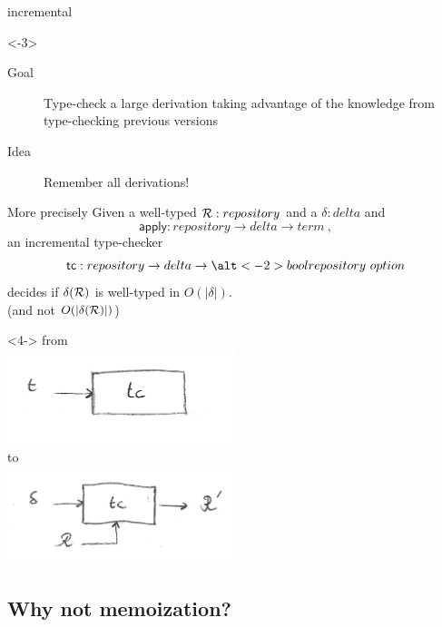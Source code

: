 \documentclass[ignorenonframetext,red]{beamer}
\begin{document}
\begin{frame}{ incremental
    }
  \begin{onlyenv}<-3>
    \begin{description}
    \item[Goal] Type-check a large derivation taking advantage of the
      knowledge from type-checking previous versions
    \item[Idea] Remember all derivations!
    \end{description}
    \pause \inXLF
    \begin{block}{More precisely}
      Given a well-typed $\mathcal{R} : repository$ and a $\delta : delta$
      and $$\mathsf{apply} : repository \to delta \to term\ ,$$an
      incremental type-checker $$\mathsf{tc} : repository \to delta
      \to \alt<-2>{bool}{repository\ option} $$ decides if
      $\delta(\mathcal{R})$ is
      well-typed in $O(|\delta|)$. \\
      {\hfill\scriptsize (and not $O(|\delta(\mathcal{R})|)$)}
    \end{block}
  \end{onlyenv}
  \begin{onlyenv}<4->
    from \\
    {\centering\includegraphics[width=0.5\textwidth]{images/tc-classic.png}\\}
    to \\
    {\centering\includegraphics[width=0.5\textwidth]{images/tc-delta1.png}\\}
  \end{onlyenv}
\end{frame}

\subsection{Why not memoization?}
\end{document}
